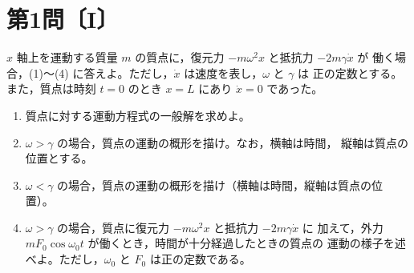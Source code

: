 \section*{第1問〔I〕}

$x$ 軸上を運動する質量 $m$ の質点に，復元力 $-m\omega^2 x$ と抵抗力 $-2m\gamma\dot{x}$ が
働く場合，(1)〜(4) に答えよ。ただし，$\dot{x}$ は速度を表し，$\omega$ と $\gamma$ は
正の定数とする。また，質点は時刻 $t=0$ のとき $x=L$ にあり $\dot{x}=0$ であった。

\begin{enumerate}[label=(\arabic*)]
  \item 質点に対する運動方程式の一般解を求めよ。
  \item $\omega>\gamma$ の場合，質点の運動の概形を描け。なお，横軸は時間，
        縦軸は質点の位置とする。
  \item $\omega<\gamma$ の場合，質点の運動の概形を描け（横軸は時間，縦軸は質点の位置）。
  \item $\omega>\gamma$ の場合，質点に復元力 $-m\omega^2 x$ と抵抗力 $-2m\gamma\dot{x}$ に
        加えて，外力 $mF_0\cos\omega_0 t$ が働くとき，時間が十分経過したときの質点の
        運動の様子を述べよ。ただし，$\omega_0$ と $F_0$ は正の定数である。
\end{enumerate}
